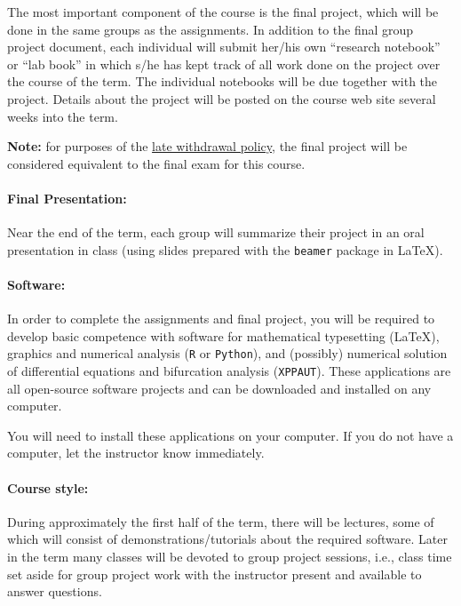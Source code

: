 \documentclass[12pt]{article}
\begin{document}
\begin{center}
The most important component of the course is the final project, which
will be done in the same groups as the assignments.  In addition to
the final group project document, each individual will submit her/his
own ``research notebook'' or ``lab book'' in which s/he has kept track
of all work done on the project over the course of the term.  The
individual notebooks will be due together with the project.  Details
about the project will be posted on the course web site several weeks
into the term.

\textbf{Note:} for purposes of the \href{https://academiccalendars.romcmaster.ca/content.php?catoid=38&navoid=8043#late_withdrawal}{late withdrawal policy}, the final project will be considered equivalent to the final exam for this course.

\paragraph*{Final Presentation:}
Near the end of the term, each group will summarize their project in an oral presentation in class (using slides prepared with the {\tt beamer} package in \LaTeX).

\paragraph*{Software:} In order to complete the assignments and final project, you will be required to develop basic competence with software for mathematical typesetting (\LaTeX), graphics and numerical analysis ({\tt R} or {\tt Python}), and (possibly) numerical solution of differential equations and bifurcation analysis ({\tt XPPAUT}).  These applications are all open-source software projects and can be downloaded and installed on any computer.

\noindent You will need to install these applications on your computer.  If you do not have a computer, let the instructor know immediately.

\paragraph*{Course style:}

During approximately the first half of the term, there will be lectures, some of which will consist of demonstrations/tutorials about the required software.  Later in the term many classes will be devoted to group project sessions, i.e., class time set aside for group project work with the instructor present and available to answer questions.


\end{center}
\end{document}
